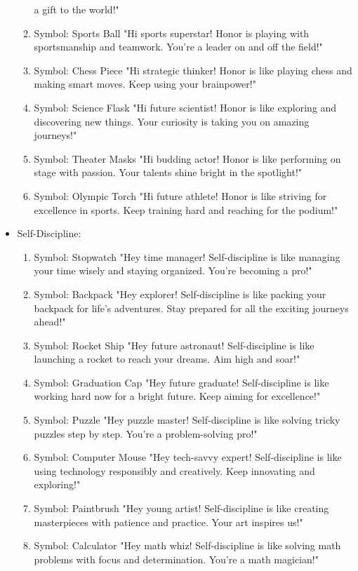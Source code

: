 \documentclass[11pt]{article}
\begin{document}
\begin{itemize}
\begin{enumerate}
a gift to the world!"
\item Symbol: Sports Ball
"Hi sports superstar! Honor is playing with sportsmanship and teamwork. You're a
leader on and off the field!"
\item Symbol: Chess Piece
"Hi strategic thinker! Honor is like playing chess and making smart moves. Keep
using your brainpower!"
\item Symbol: Science Flask
"Hi future scientist! Honor is like exploring and discovering new things. Your
curiosity is taking you on amazing journeys!"
\item Symbol: Theater Masks
"Hi budding actor! Honor is like performing on stage with passion. Your talents
shine bright in the spotlight!"
\item Symbol: Olympic Torch
"Hi future athlete! Honor is like striving for excellence in sports. Keep training
hard and reaching for the podium!"
\end{enumerate}
\item Self-Discipline:
\begin{enumerate}
\item Symbol: Stopwatch
"Hey time manager! Self-discipline is like managing your time wisely and staying
organized. You're becoming a pro!"
\item Symbol: Backpack
"Hey explorer! Self-discipline is like packing your backpack for life's
adventures. Stay prepared for all the exciting journeys ahead!"
\item Symbol: Rocket Ship
"Hey future astronaut! Self-discipline is like launching a rocket to reach your
dreams. Aim high and soar!"
\item Symbol: Graduation Cap
"Hey future graduate! Self-discipline is like working hard now for a bright
future. Keep aiming for excellence!"
\item Symbol: Puzzle
"Hey puzzle master! Self-discipline is like solving tricky puzzles step by step.
You're a problem-solving pro!"
\item Symbol: Computer Mouse
"Hey tech-savvy expert! Self-discipline is like using technology responsibly and
creatively. Keep innovating and exploring!"
\item Symbol: Paintbrush
"Hey young artist! Self-discipline is like creating masterpieces with patience and
practice. Your art inspires us!"
\item Symbol: Calculator
"Hey math whiz! Self-discipline is like solving math problems with focus and
determination. You're a math magician!"
\end{enumerate}
\end{itemize}
\end{document}
